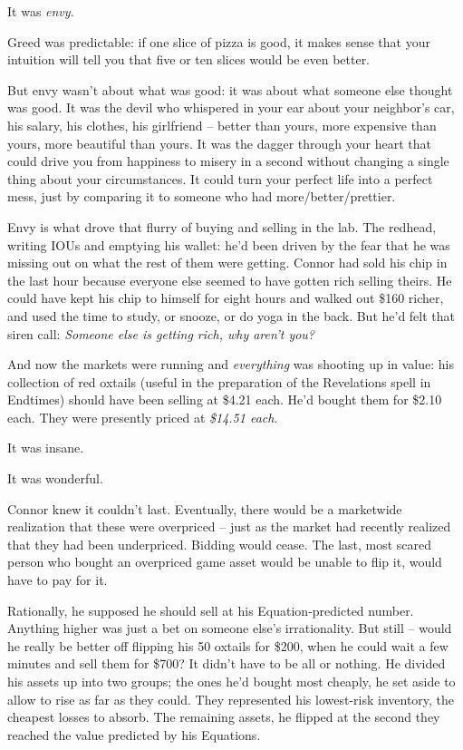 It was \emph{envy}.

Greed was predictable: if one slice of pizza is good, it makes
sense that your intuition will tell you that five or ten slices
would be even better.

But envy wasn't about what was good: it was about what someone else
thought was good. It was the devil who whispered in your ear about
your neighbor's car, his salary, his clothes, his girlfriend --
better than yours, more expensive than yours, more beautiful than
yours. It was the dagger through your heart that could drive you
from happiness to misery in a second without changing a single
thing about your circumstances. It could turn your perfect life
into a perfect mess, just by comparing it to someone who had
more/better/prettier.

Envy is what drove that flurry of buying and selling in the lab.
The redhead, writing IOUs and emptying his wallet: he'd been driven
by the fear that he was missing out on what the rest of them were
getting. Connor had sold his chip in the last hour because everyone
else seemed to have gotten rich selling theirs. He could have kept
his chip to himself for eight hours and walked out \$160 richer,
and used the time to study, or snooze, or do yoga in the back. But
he'd felt that siren call:
\emph{Someone else is getting rich, why aren't you?}

And now the markets were running and \emph{everything} was shooting
up in value: his collection of red oxtails (useful in the
preparation of the Revelations spell in Endtimes) should have been
selling at \$4.21 each. He'd bought them for \$2.10 each. They were
presently priced at \emph{\$14.51 each}.

It was insane.

It was wonderful.

Connor knew it couldn't last. Eventually, there would be a
marketwide realization that these were overpriced -- just as the
market had recently realized that they had been underpriced.
Bidding would cease. The last, most scared person who bought an
overpriced game asset would be unable to flip it, would have to pay
for it.

Rationally, he supposed he should sell at his Equation-predicted
number. Anything higher was just a bet on someone else's
irrationality. But still -- would he really be better off flipping
his 50 oxtails for \$200, when he could wait a few minutes and sell
them for \$700? It didn't have to be all or nothing. He divided his
assets up into two groups; the ones he'd bought most cheaply, he
set aside to allow to rise as far as they could. They represented
his lowest-risk inventory, the cheapest losses to absorb. The
remaining assets, he flipped at the second they reached the value
predicted by his Equations.


